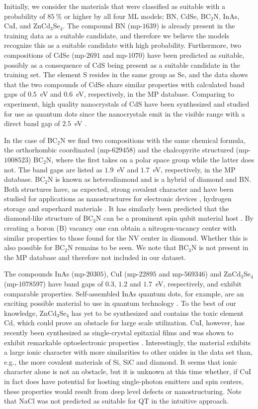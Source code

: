 \documentclass[superscriptaddress,unsortedaddress,
 amsmath,amssymb,
 aps,
]{revtex4-2}
\begin{document}
Initially, we consider the materials that were classified as suitable with a probability of $85 \ \%$ or higher by all four ML models; BN, CdSe, BC$_2$N, InAs, CuI, and ZnCd$_3$Se$_4$. 
The compound BN (mp-$1639$) is already present in the training data as a suitable candidate, and therefore we believe the models recognize this as a suitable candidate with high probability. Furthermore, two compositions of CdSe (mp-$2691$ and mp-$1070$) have been predicted as suitable, possibly as a consequence of CdS being present as a suitable candidate in the training set. The element S resides in the same group as Se, and the data shows that the two compounds of CdSe share similar properties with calculated band gaps of $0.5$~eV and $0.6$~eV, respectively, in the MP database. 
Comparing to experiment, high quality nanocrystals of CdS have been synthesized and studied for use as quantum dots since the nanocrystals emit in the visible range with a direct band gap of $2.5$~eV \cite{CelebiSerdar2007SaCo, BanerjeeR2000Eots}.   

In the case of BC$_2$N we find two compositions with the same chemical formula, the orthorhombic coordinated (mp-$629458$) and the chalcopyrite structured (mp-$1008523$) BC$_2$N, where the first takes on a polar space group while the latter does not. The band gaps are listed as $1.9$~eV and $1.7$~eV, respectively, in the MP database. BC$_2$N is known as heterodiamond and is a hybrid of diamond and BN. Both structures have, as expected, strong covalent character and have been studied for applications as nanostructures for electronic devices \cite{Gao2017}, hydrogen storage \cite{Cai2017} and superhard materials \cite{Li2017, Jiang2020}. It has similarly been predicted that the diamond-like structure of BC$_3$N can be a prominent spin qubit material host \cite{Wang2020SpinQB}. By creating a boron (B) vacancy one can obtain a nitrogen-vacancy center with similar properties to those found for the NV center in diamond. Whether this is also possible for BC$_2$N remains to be seen. We note that BC$_3$N is not present in the MP database and therefore not included in our dataset.

The compounds InAs (mp-$20305$), CuI (mp-$22895$ and mp-$569346$) and ZnCd$_3$Se$_4$ (mp-$1078597$) have band gaps of $0.3$, $1.2$ and $1.7$~eV, respectively, and exhibit comparable properties. Self-assembled InAs quantum dots, for example, are an exciting possible material to use in quantum technology \cite{Liu2018}. To the best of our knowledge, ZnCd$_3$Se$_4$ has yet to be synthesized and contains the toxic element Cd, which could prove an obstacle for large scale utilization. CuI, however, has recently been synthesized as single-crystal epitaxial films and was shown to exhibit remarkable optoelectronic properties \cite{Ahn2020}. Interestingly, the material exhibits a large ionic character with more similarities to other oxides in the data set than, e.g., the more covalent materials of Si, SiC and diamond.  
It seems that ionic character alone is not an obstacle, but it is unknown at this time whether, if CuI in fact does have potential for hosting single-photon emitters and spin centers, these properties would result from deep level defects or nanostructuring. 
Note that NaCl was not predicted as suitable for QT in the intuitive approach. 
\end{document}
